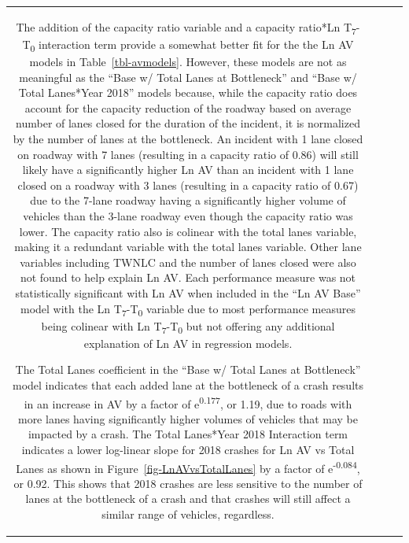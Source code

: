 \documentclass[
  letterpaper,
  authoryear]{elsarticle}
\begin{document}
\begin{table}
{\begin{tabular}[t]{c|c|c|c}
\begin{table}
The addition of the capacity ratio variable and a capacity ratio*Ln
T\textsubscript{7}-T\textsubscript{0} interaction term provide a
somewhat better fit for the the Ln AV models in
Table~\ref{tbl-avmodels}. However, these models are not as meaningful as
the ``Base w/ Total Lanes at Bottleneck'' and ``Base w/ Total Lanes*Year
2018'' models because, while the capacity ratio does account for the
capacity reduction of the roadway based on average number of lanes
closed for the duration of the incident, it is normalized by the number
of lanes at the bottleneck. An incident with 1 lane closed on roadway
with 7 lanes (resulting in a capacity ratio of 0.86) will still likely
have a significantly higher Ln AV than an incident with 1 lane closed on
a roadway with 3 lanes (resulting in a capacity ratio of 0.67) due to
the 7-lane roadway having a significantly higher volume of vehicles than
the 3-lane roadway even though the capacity ratio was lower. The
capacity ratio also is colinear with the total lanes variable, making it
a redundant variable with the total lanes variable. Other lane variables
including TWNLC and the number of lanes closed were also not found to
help explain Ln AV. Each performance measure was not statistically
significant with Ln AV when included in the ``Ln AV Base'' model with
the Ln T\textsubscript{7}-T\textsubscript{0} variable due to most
performance measures being colinear with Ln
T\textsubscript{7}-T\textsubscript{0} but not offering any additional
explanation of Ln AV in regression models.

The Total Lanes coefficient in the ``Base w/ Total Lanes at Bottleneck''
model indicates that each added lane at the bottleneck of a crash
results in an increase in AV by a factor of e\textsuperscript{0.177}, or
1.19, due to roads with more lanes having significantly higher volumes
of vehicles that may be impacted by a crash. The Total Lanes*Year 2018
Interaction term indicates a lower log-linear slope for 2018 crashes for
Ln AV vs Total Lanes as shown in Figure~\ref{fig-LnAVvsTotalLanes} by a
factor of e\textsuperscript{-0.084}, or 0.92. This shows that 2018
crashes are less sensitive to the number of lanes at the bottleneck of a
crash and that crashes will still affect a similar range of vehicles,
regardless.

\begin{figure}

\centering{

\texttt{[image: 04\_results\_files/figure-pdf/fig-LnAVvsTotalLanes-1.pdf]}

}
\end{figure}
\end{table}
\end{tabular}}
\end{table}
\end{document}
